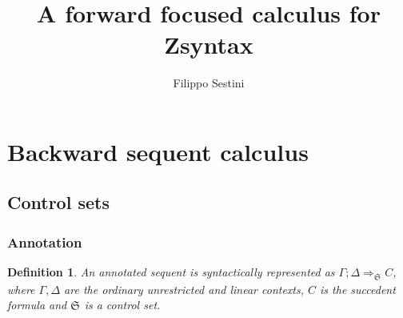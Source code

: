 \documentclass{article}
\title{A forward focused calculus for Zsyntax}
\author{Filippo Sestini}
\newtheorem{definition}{Definition}
\newcommand{\ctrlset}[1]{\mathfrak{S}_{#1}}
\begin{document}
\maketitle
\tableofcontents

\section{Backward sequent calculus}

\subsection{Control sets}

\subsubsection{Annotation}

\begin{definition}
  An annotated sequent is syntactically represented as $\Gamma; \Delta
  \Longrightarrow_{\ctrlset{}} C$, where $\Gamma, \Delta$ are the ordinary
  unrestricted and linear contexts, $C$ is the succedent formula and
  $\ctrlset{}$ is a control set.
\end{definition}
\end{document}
